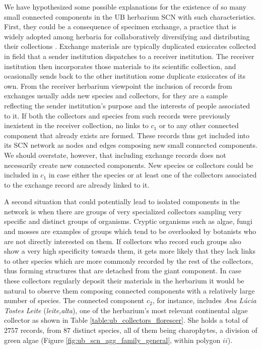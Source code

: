 We have hypothesized some possible explanations for the existence of so many small connected components in the UB herbarium SCN with such characteristics. First, they could be a consequence of specimen exchange, a practice that is widely adopted among herbaria for collaboratively diversifying and distributing their collections \cite{Groom2014}. Exchange materials are typically duplicated exsiccates collected in field that a sender institution dispatches to a receiver institution. The receiver institution then incorporates those materials to its scientific collection, and ocasionally sends back to the other institution some duplicate exsiccates of its own.
From the receiver herbarium viewpoint the inclusion of records from exchanges usually adds new species and collectors, for they are a sample reflecting the sender institution's purpose and the interests of people associated to it. If both the collectors and species from such records were previously inexistent in the receiver collection, no links to $c_1$ or to any other connected component that already exists are formed. These records thus get included into its SCN network as nodes and edges composing new small connected components. We should overstate, however, that including exchange records does not necessarily create new connected components. New species or collectors could be included in $c_1$ in case either the species or at least one of the collectors associated to the exchange record are already linked to it.

A second situation that could potentially lead to isolated components in the network is when there are groups of very specialized collectors sampling very specific and distinct groups of organisms. 
Cryptic organisms such as algae, fungi and mosses are examples of groups which tend to be overlooked by botanists who are not directly interested on them. 
If collectors who record such groups also show a very high specificity towards them, it gets more likely that they lack links to other species which are more commonly recorded by the rest of the collectors, thus forming structures that are detached from the giant component. 
In case these collectors regularly deposit their materials in the herbarium it would be natural to observe them composing connected components with a relatively large number of species.
The connected component $c_2$, for instance, includes \textit{Ana Lúcia Tostes Leite} (\textit{leite,alta}), one of the herbarium's most relevant continental algae collector as shown in Table \ref{table:ub_collectors_florescer}.
She holds a total of $2757$ records, from $87$ distinct species, all of them being charophytes, a division of green algae (Figure \ref{fig:ub_scn_agg_family_general}, within polygon $ii$).



